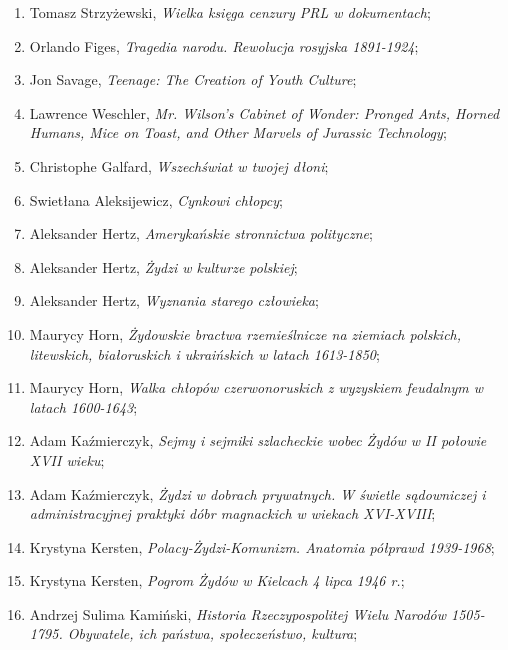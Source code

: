 \documentclass[a4paper,11pt]{article}
\begin{document}
\begin{enumerate}
\item Tomasz Strzyżewski, \emph{Wielka księga cenzury PRL w
    dokumentach};

\item Orlando Figes, \emph{Tragedia narodu. Rewolucja rosyjska
    1891-1924};

\item Jon Savage, \emph{Teenage: The Creation of Youth Culture};

\item Lawrence Weschler, \emph{Mr. Wilson's Cabinet of Wonder: Pronged
    Ants, Horned Humans, Mice on Toast, and Other Marvels of Jurassic
    Technology};

\item Christophe Galfard, \emph{Wszechświat w twojej dłoni};

\item Swietłana Aleksijewicz, \emph{Cynkowi chłopcy};

\item Aleksander Hertz, \emph{Amerykańskie stronnictwa polityczne};

\item Aleksander Hertz, \emph{Żydzi w kulturze polskiej};

\item Aleksander Hertz, \emph{Wyznania starego człowieka};

\item Maurycy Horn, \emph{Żydowskie bractwa rzemieślnicze na ziemiach
    polskich, litewskich, białoruskich i ukraińskich w latach
    1613-1850};

\item Maurycy Horn, \emph{Walka chłopów czerwonoruskich z wyzyskiem
    feudalnym w latach 1600-1643};


\item Adam Kaźmierczyk, \emph{Sejmy i sejmiki szlacheckie wobec Żydów
    w II połowie XVII wieku};

\item Adam Kaźmierczyk, \emph{Żydzi w dobrach prywatnych. W świetle
    sądowniczej i administracyjnej praktyki dóbr magnackich w wiekach
    XVI-XVIII};

\item Krystyna Kersten, \emph{Polacy-Żydzi-Komunizm. Anatomia półprawd
    1939-1968};

\item Krystyna Kersten, \emph{Pogrom Żydów w Kielcach 4 lipca 1946
    r.};

\item Andrzej Sulima Kamiński, \emph{Historia Rzeczypospolitej Wielu
    Narodów 1505-1795. Obywatele, ich państwa, społeczeństwo,
    kultura};


\end{enumerate}
\end{document}
